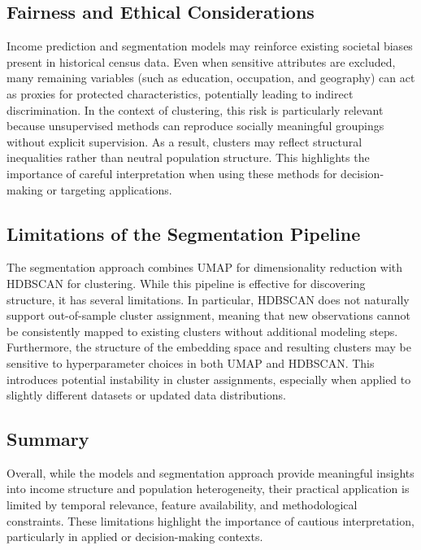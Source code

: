 \subsection{Fairness and Ethical Considerations}

Income prediction and segmentation models may reinforce existing societal biases present in historical census data. Even when sensitive attributes are excluded, many remaining variables (such as education, occupation, and geography) can act as proxies for protected characteristics, potentially leading to indirect discrimination. In the context of clustering, this risk is particularly relevant because unsupervised methods can reproduce socially meaningful groupings without explicit supervision. As a result, clusters may reflect structural inequalities rather than neutral population structure. This highlights the importance of careful interpretation when using these methods for decision-making or targeting applications.

\subsection{Limitations of the Segmentation Pipeline}

The segmentation approach combines UMAP for dimensionality reduction with HDBSCAN for clustering. While this pipeline is effective for discovering structure, it has several limitations. In particular, HDBSCAN does not naturally support out-of-sample cluster assignment, meaning that new observations cannot be consistently mapped to existing clusters without additional modeling steps. Furthermore, the structure of the embedding space and resulting clusters may be sensitive to hyperparameter choices in both UMAP and HDBSCAN. This introduces potential instability in cluster assignments, especially when applied to slightly different datasets or updated data distributions.

\subsection{Summary}

Overall, while the models and segmentation approach provide meaningful insights into income structure and population heterogeneity, their practical application is limited by temporal relevance, feature availability, and methodological constraints. These limitations highlight the importance of cautious interpretation, particularly in applied or decision-making contexts.

